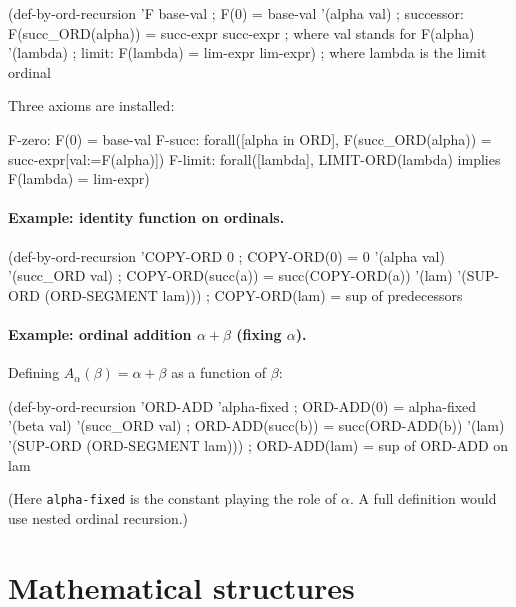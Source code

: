\begin{VNBcode}
(def-by-ord-recursion 'F
  base-val            ; F(0) = base-val
  '(alpha val)        ; successor: F(succ_ORD(alpha)) = succ-expr
  succ-expr           ;   where val stands for F(alpha)
  '(lambda)           ; limit: F(lambda) = lim-expr
  lim-expr)           ;   where lambda is the limit ordinal
\end{VNBcode}

Three axioms are installed:
\begin{VNBsnip}
F-zero:  F(0) = base-val
F-succ:  forall([alpha in ORD],
           F(succ_ORD(alpha)) = succ-expr[val:=F(alpha)])
F-limit: forall([lambda], LIMIT-ORD(lambda) implies F(lambda) = lim-expr)
\end{VNBsnip}

\paragraph{Example: identity function on ordinals.}
\begin{VNBcode}
(def-by-ord-recursion 'COPY-ORD
  0                                         ; COPY-ORD(0) = 0
  '(alpha val) '(succ_ORD val)              ; COPY-ORD(succ(a)) = succ(COPY-ORD(a))
  '(lam) '(SUP-ORD (ORD-SEGMENT lam)))      ; COPY-ORD(lam) = sup of predecessors
\end{VNBcode}

\paragraph{Example: ordinal addition $\alpha + \beta$ (fixing $\alpha$).}

Defining $A_\alpha(\beta) = \alpha + \beta$ as a function of $\beta$:
\begin{VNBcode}
(def-by-ord-recursion 'ORD-ADD
  'alpha-fixed                              ; ORD-ADD(0) = alpha-fixed
  '(beta val) '(succ_ORD val)              ; ORD-ADD(succ(b)) = succ(ORD-ADD(b))
  '(lam) '(SUP-ORD (ORD-SEGMENT lam)))     ; ORD-ADD(lam) = sup of ORD-ADD on lam
\end{VNBcode}

(Here \texttt{alpha-fixed} is the constant playing the role of $\alpha$.
A full definition would use nested ordinal recursion.)

\section{Mathematical structures}
\label{sec:declare-structure}

